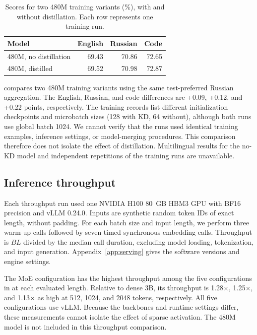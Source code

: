 \documentclass[11pt]{article}
\begin{document}
\begin{table}[!t]
  \caption{Scores for two 480M training variants (\%), with and without distillation. Each row represents one training run.}
  \label{tab:distillation-ablation}
  \centering
  \small
  \setlength{\tabcolsep}{3.5pt}
  \begin{tabular}{lrrr}
    \toprule
    \textbf{Model} & \textbf{English} & \textbf{Russian} & \textbf{Code} \\
    \midrule
    480M, no distillation & 69.43 & 70.86 & 72.65 \\
    480M, distilled       & 69.52 & 70.98 & 72.87 \\
    \bottomrule
  \end{tabular}
\end{table}

 compares two 480M training variants using the same test-preferred Russian aggregation.
The English, Russian, and code differences are +0.09, +0.12, and +0.22 points, respectively.
The training records list different initialization checkpoints and microbatch sizes (128 with KD, 64 without), although both runs use global batch 1024.
We cannot verify that the runs used identical training examples, inference settings, or model-merging procedures.
This comparison therefore does not isolate the effect of distillation.
Multilingual results for the no-KD model and independent repetitions of the training runs are unavailable.

\subsection{Inference throughput}

Each throughput run used one NVIDIA H100 80~GB HBM3 GPU with BF16 precision and vLLM 0.24.0.
Inputs are synthetic random token IDs of exact length, without padding.
For each batch size and input length, we perform three warm-up calls followed by seven timed synchronous embedding calls.
Throughput is $BL$ divided by the median call duration, excluding model loading, tokenization, and input generation.
Appendix~\ref{app:serving} gives the software versions and engine settings.

The MoE configuration has the highest throughput among the five configurations in  at each evaluated length.
Relative to dense 3B, its throughput is 1.28$\times$, 1.25$\times$, and 1.13$\times$ as high at 512, 1024, and 2048 tokens, respectively.
All five configurations use vLLM.
Because the backbones and runtime settings differ, these measurements cannot isolate the effect of sparse activation.
The 480M model is not included in this throughput comparison.
\end{document}
